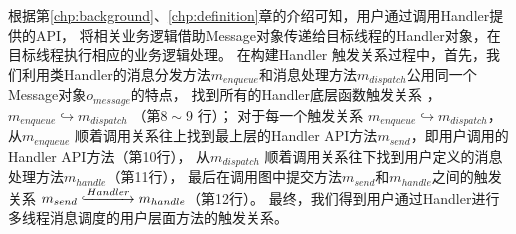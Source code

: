 
根据第\ref{chp:background}、\ref{chp:definition}章的介绍可知，用户通过调用Handler提供的API，
将相关业务逻辑借助Message对象传递给目标线程的Handler对象，在目标线程执行相应的业务逻辑处理。
在构建{Handler} 触发关系过程中，首先，我们利用类{Handler}的消息分发方法$m_{enqueue}$和消息处理方法$m_{dispatch}$公用同一个Message对象$o_{message}$的特点，
找到所有的Handler底层函数触发关系 ，$m_{enqueue}  \hookrightarrow  m_{dispatch}$ （第$8\sim$9 行）；
对于每一个触发关系 $m_{enqueue}  \hookrightarrow  m_{dispatch}$，
从$m_{enqueue}$ 顺着调用关系往上找到最上层的Handler API方法$m_{send}$，即用户调用的Handler API方法（第10行），
从$m_{dispatch}$ 顺着调用关系往下找到用户定义的消息处理方法$m_{handle}$（第11行），
最后在调用图中提交方法$m_{send}$和$m_{handle}$之间的触发关系 $m_{send} \lhook\joinrel\xrightarrow{Handler} m_{handle}$（第12行）。
最终，我们得到用户通过Handler进行多线程消息调度的用户层面方法的触发关系。


